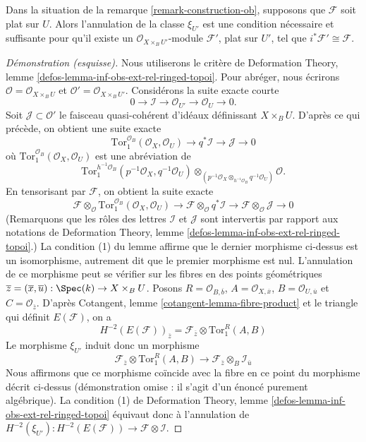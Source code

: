 \begin{lemma}
\label{lemma-ob-is-obstruction}
Dans la situation de la remarque \ref{remark-construction-ob}, supposons que
$\mathcal{F}$ soit plat sur $U$. Alors l'annulation de la classe $\xi_{U'}$
est une condition nécessaire et suffisante pour qu'il existe un
$\mathcal{O}_{X \times_B U'}$-module $\mathcal{F}'$, plat sur $U'$, tel que
$i^*\mathcal{F}' \cong \mathcal{F}$.
\end{lemma}

\begin{proof}[Démonstration (esquisse)]
Nous utiliserons le critère de
Deformation Theory, lemme \ref{defos-lemma-inf-obs-ext-rel-ringed-topoi}.
Pour abréger, nous écrirons
$\mathcal{O} = \mathcal{O}_{X \times_B U}$ et
$\mathcal{O}' = \mathcal{O}_{X \times_B U'}$.
Considérons la suite exacte courte
$$
0 \to \mathcal{I} \to \mathcal{O}_{U'} \to \mathcal{O}_U \to 0.
$$
Soit $\mathcal{J} \subset \mathcal{O}'$ le faisceau quasi-cohérent d'idéaux
définissant $X \times_B U$. D'après ce qui précède, on obtient une suite exacte
$$
\text{Tor}_1^{\mathcal{O}_B}(\mathcal{O}_X, \mathcal{O}_U) \to
q^*\mathcal{I} \to \mathcal{J} \to 0
$$
où $\text{Tor}_1^{\mathcal{O}_B}(\mathcal{O}_X, \mathcal{O}_U)$ est une
abréviation de
$$
\text{Tor}_1^{h^{-1}\mathcal{O}_B}(p^{-1}\mathcal{O}_X, q^{-1}\mathcal{O}_U)
\otimes_{(p^{-1}\mathcal{O}_X\otimes_{h^{-1}\mathcal{O}_B}q^{-1}\mathcal{O}_U)}
\mathcal{O}.
$$
En tensorisant par $\mathcal{F}$, on obtient la suite exacte
$$
\mathcal{F} \otimes_\mathcal{O}
\text{Tor}_1^{\mathcal{O}_B}(\mathcal{O}_X, \mathcal{O}_U) \to
\mathcal{F} \otimes_\mathcal{O}
q^*\mathcal{I} \to
\mathcal{F} \otimes_\mathcal{O} \mathcal{J} \to 0
$$
(Remarquons que les rôles des lettres $\mathcal{I}$ et $\mathcal{J}$ sont
intervertis par rapport aux notations de
Deformation Theory, lemme \ref{defos-lemma-inf-obs-ext-rel-ringed-topoi}.)
La condition (1) du lemme affirme que le dernier morphisme ci-dessus est un
isomorphisme, autrement dit que le premier morphisme est nul.
L'annulation de ce morphisme peut se vérifier sur les fibres en des points géométriques
$\overline{z} = (\overline{x}, \overline{u}) : \Spec(k) \to X \times_B U$.
Posons $R = \mathcal{O}_{B, \overline{b}}$,
$A = \mathcal{O}_{X, \overline{x}}$,
$B = \mathcal{O}_{U, \overline{u}}$ et
$C = \mathcal{O}_{\overline{z}}$.
D'après Cotangent, lemme \ref{cotangent-lemma-fibre-product}
et le triangle qui définit $E(\mathcal{F})$, on a
$$
H^{-2}(E(\mathcal{F}))_{\overline{z}} =
\mathcal{F}_{\overline{z}} \otimes \text{Tor}_1^R(A, B)
$$
Le morphisme $\xi_{U'}$ induit donc un morphisme
$$
\mathcal{F}_{\overline{z}} \otimes \text{Tor}_1^R(A, B)
\longrightarrow
\mathcal{F}_{\overline{z}} \otimes_B \mathcal{I}_{\overline{u}}
$$
Nous affirmons que ce morphisme coïncide avec la fibre en ce point du
morphisme décrit ci-dessus (démonstration omise : il s'agit d'un énoncé
purement algébrique). La condition (1) de
Deformation Theory, lemme \ref{defos-lemma-inf-obs-ext-rel-ringed-topoi}
équivaut donc à l'annulation de
$H^{-2}(\xi_{U'}) :
H^{-2}(E(\mathcal{F})) \to \mathcal{F} \otimes \mathcal{I}$.


\end{proof}
